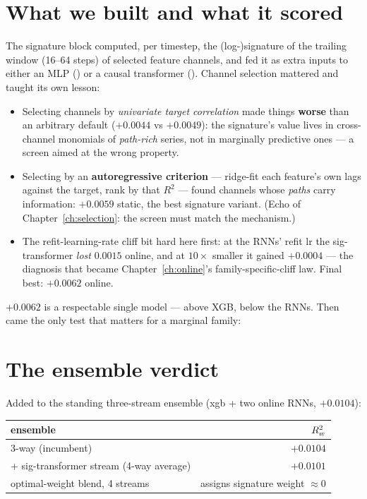 \section{What we built and what it scored}

The signature block computed, per timestep, the (log-)signature of the
trailing window (16--64 steps) of selected feature channels, and fed it as
extra inputs to either an MLP () or a causal transformer
(). Channel selection mattered and taught its own
lesson:

\begin{itemize}
\item Selecting channels by \emph{univariate target correlation} made
  things \textbf{worse} than an arbitrary default ($+0.0044$ vs
  $+0.0049$): the signature's value lives in cross-channel monomials of
  \emph{path-rich} series, not in marginally predictive ones ---
  a screen aimed at the wrong property.
\item Selecting by an \textbf{autoregressive criterion} --- ridge-fit each
  feature's own lags against the target, rank by that $R^2$ --- found
  channels whose \emph{paths} carry information: $+0.0059$ static, the
  best signature variant. (Echo of Chapter~\ref{ch:selection}: the screen
  must match the mechanism.)
\item The refit-learning-rate cliff bit hard here first: at the RNNs'
  refit lr the sig-transformer \emph{lost} $0.0015$ online, and at
  $10\times$ smaller it gained $+0.0004$ --- the diagnosis that became
  Chapter~\ref{ch:online}'s family-specific-cliff law. Final best:
  $+0.0062$ online.
\end{itemize}

$+0.0062$ is a respectable single model --- above XGB, below the RNNs.
Then came the only test that matters for a marginal family:

\section{The ensemble verdict}

Added to the standing three-stream ensemble (xgb + two online RNNs,
$+0.0104$):

\begin{center}
\begin{tabular}{@{}lr@{}}
\toprule
ensemble & $R^2_{w}$ \\
\midrule
3-way (incumbent) & $+0.0104$ \\
+ sig-transformer stream (4-way average) & $+0.0101$ \\
optimal-weight blend, 4 streams & assigns signature weight $\approx 0$ \\
\bottomrule
\end{tabular}
\end{center}

